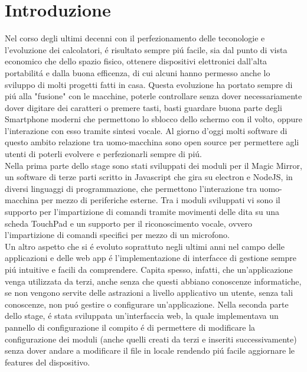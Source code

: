 \chapter*{Introduzione}

Nel corso degli ultimi decenni con il perfezionamento delle teconologie e l'evoluzione dei
calcolatori, \'e risultato sempre pi\'u facile, sia dal punto di vista economico che dello spazio fisico,
ottenere dispositivi elettronici dall'alta portabilit\'a e dalla buona efficenza, di cui
alcuni hanno permesso anche lo sviluppo di molti progetti fatti in casa.
Questa evoluzione ha portato sempre di pi\'u alla "fusione" con le macchine, poterle controllare senza
dover necessariamente dover digitare dei caratteri o premere tasti,
basti guardare buona parte degli Smartphone moderni che permettono lo sblocco dello schermo con
il volto, oppure l'interazione con esso tramite sintesi vocale.
Al giorno d'oggi molti software di questo ambito relazione tra uomo-macchina
sono open source per permettere agli utenti di poterli evolvere e perfezionarli sempre di pi\'u.\\
Nella prima parte dello stage sono stati sviluppati dei moduli per il Magic Mirror, un software
di terze parti scritto in Javascript che gira su electron e NodeJS,
in diversi linguaggi di programmazione, che permettono l'interazione tra uomo-macchina per
mezzo di periferiche esterne.
Tra i moduli sviluppati vi sono il supporto per l'impartizione di comandi
tramite movimenti delle dita su una scheda TouchPad e un supporto per il riconoscimento vocale,
ovvero l'impartizione di comandi specifici per mezzo di un microfono.
\\[2\baselineskip]
Un altro aspetto che si \'e evoluto soprattuto negli ultimi anni nel campo
delle applicazioni e delle web app \'e l'implementazione di interfacce di gestione sempre pi\'u
intuitive e facili da comprendere. Capita spesso, infatti, che un'applicazione
venga utilizzata da terzi, anche senza che questi abbiano conoscenze informatiche,
se non vengono servite delle astrazioni a livello applicativo un utente, senza
tali conoscenze, non pu\'o gestire o configurare un'applicazione.
Nella seconda parte dello stage,
\'e stata sviluppata un'interfaccia web, la quale implementava un pannello di configurazione
il compito \'e di permettere di modificare la configurazione
dei moduli (anche quelli creati da terzi e inseriti successivamente) senza dover andare a modificare il
file in locale rendendo pi\'u facile aggiornare le features del dispositivo.
